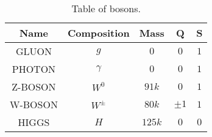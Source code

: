 \documentclass{article}
\begin{document}
\begin{table}[h!]
    \centering
    \begin{tabular}{||c c c c c||} 
     \hline
     Name & Composition & Mass & Q & S \\ [0.5ex] 
     \hline\hline
     GLUON & $g$ & $0$ & $0$ & $1$ \\[1ex] 
     PHOTON & $\gamma$ & $0$ & $0$ & $1$ \\[1ex]
     Z-BOSON & $W^0$ & $91k$ & $0$ & $1$ \\[1ex]
     W-BOSON & $W^\pm$ & $80k$ & $\pm 1$ & $1$ \\[1ex]
     HIGGS & $H$ & $125k$ & $0$ & $0$ \\[1ex]
     \hline
    \end{tabular}
    \caption{Table of bosons.}
    \label{table:bosons}
\end{table}
\end{document}
